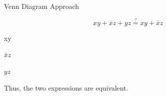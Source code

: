 \documentclass[12pt,openany]{book}
\begin{document}
			      	Venn Diagram Approach
			      	
			      	\[
			      		xy + \overline{x}z + yz \stackrel{?}{=} xy + \bar{x}z
			      	\]
			      	
			      	
			      	\noindent %
			      	\begin{minipage}[htp]{.33\textwidth}
			      		\centering %
			      		\begin{venndiagram3sets}[labelA=\(x\), labelB=\(y\), labelC=\(z\)]
			      			\fillACapB
			      		\end{venndiagram3sets}
			      		xy %
			      	\end{minipage}%
			      	\begin{minipage}[htp]{.33\textwidth}
			      		\centering
			      		\begin{venndiagram3sets}[labelA=\(x\), labelB=\(y\), labelC=\(z\)]
			      			\fillCNotA
			      		\end{venndiagram3sets}
			      		$\bar{x}z$
			      	\end{minipage}%
			      	\begin{minipage}[htp]{.33\textwidth}
			      		\centering
			      		\begin{venndiagram3sets}[labelA=\(x\), labelB=\(y\), labelC=\(z\)]
			      			\fillBCapC
			      		\end{venndiagram3sets}
			      		$yz$
			      	\end{minipage}
			      	
			      	\vspace{10px}
			      	Thus, the two expressions are equivalent. \newline \vspace*{20px}
			      	
			
\end{document}
